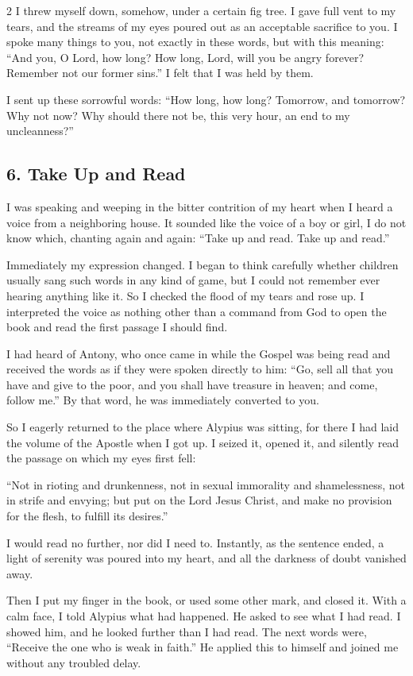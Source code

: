 \documentclass[12pt]{article}
\begin{document}
\begin{multicols}{2}
I threw myself down, somehow, under a certain fig tree. I gave full vent to my tears, and the streams of my eyes poured out as an acceptable sacrifice to you. I spoke many things to you, not exactly in these words, but with this meaning: ``And you, O Lord, how long? How long, Lord, will you be angry forever? Remember not our former sins.'' I felt that I was held by them.

I sent up these sorrowful words: ``How long, how long? Tomorrow, and tomorrow? Why not now? Why should there not be, this very hour, an end to my uncleanness?''

\subsection*{6. Take Up and Read}
I was speaking and weeping in the bitter contrition of my heart when I heard a voice from a neighboring house. It sounded like the voice of a boy or girl, I do not know which, chanting again and again: ``Take up and read. Take up and read.''

Immediately my expression changed. I began to think carefully whether children usually sang such words in any kind of game, but I could not remember ever hearing anything like it. So I checked the flood of my tears and rose up. I interpreted the voice as nothing other than a command from God to open the book and read the first passage I should find.

I had heard of Antony, who once came in while the Gospel was being read and received the words as if they were spoken directly to him: ``Go, sell all that you have and give to the poor, and you shall have treasure in heaven; and come, follow me.'' By that word, he was immediately converted to you.

So I eagerly returned to the place where Alypius was sitting, for there I had laid the volume of the Apostle when I got up. I seized it, opened it, and silently read the passage on which my eyes first fell:

``Not in rioting and drunkenness, not in sexual immorality and shamelessness, not in strife and envying; but put on the Lord Jesus Christ, and make no provision for the flesh, to fulfill its desires.''

I would read no further, nor did I need to. Instantly, as the sentence ended, a light of serenity was poured into my heart, and all the darkness of doubt vanished away.

Then I put my finger in the book, or used some other mark, and closed it. With a calm face, I told Alypius what had happened. He asked to see what I had read. I showed him, and he looked further than I had read. The next words were, ``Receive the one who is weak in faith.'' He applied this to himself and joined me without any troubled delay.


\end{multicols}
\end{document}
